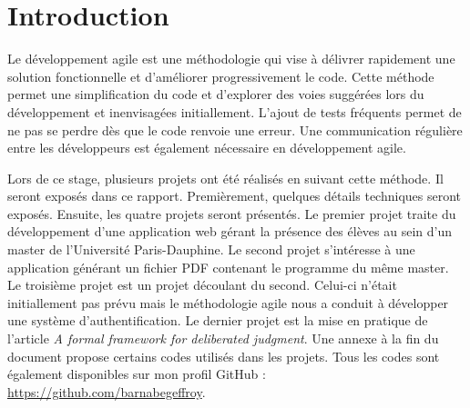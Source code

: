 \chapter*{Introduction}

Le développement agile est une méthodologie qui vise à délivrer rapidement une solution fonctionnelle et d'améliorer progressivement le code. Cette méthode permet une simplification du code et d'explorer des voies suggérées lors du développement et inenvisagées initiallement. L'ajout de tests fréquents permet de ne pas se perdre dès que le code renvoie une erreur. Une communication régulière entre les développeurs est également nécessaire en développement agile.

Lors de ce stage, plusieurs projets ont été réalisés en suivant cette méthode. Il seront exposés dans ce rapport. Premièrement, quelques détails techniques seront exposés. Ensuite, les quatre projets seront présentés. Le premier projet traite du développement d'une application web gérant la présence des élèves au sein d'un master de l'Université Paris-Dauphine. Le second projet s'intéresse à une application générant un fichier PDF contenant le programme du même master. Le troisième projet est un projet découlant du second. Celui-ci n'était initiallement pas prévu mais le méthodologie agile nous a conduit à développer une système d'authentification. Le dernier projet est la mise en pratique de l'article \textit{A formal framework for deliberated judgment}\cite{cailloux_formal_2020}. Une annexe à la fin du document propose certains codes utilisés dans les projets. Tous les codes sont également disponibles sur mon profil GitHub : \url{https://github.com/barnabegeffroy}.
